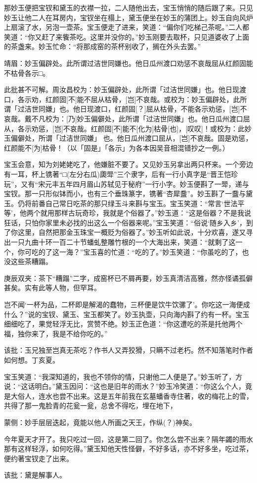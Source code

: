 \begin{parag}
    那妙玉便把宝钗和黛玉的衣襟一拉，二人随他出去，宝玉悄悄的随后跟了来。只见妙玉让他二人在耳房内，宝钗坐在榻上，黛玉便坐在妙玉的蒲团上。妙玉自向风炉上扇滚了水，另泡一壶茶。宝玉便走了进来，笑道：“偏你们吃梯己茶呢。”二人都笑道：“你又赶了来飺茶吃。这里并没你的。”妙玉刚要去取杯，只见道婆收了上面的茶盏来。妙玉忙命：“将那成窑的茶杯别收了，搁在外头去罢。”\begin{note}靖眉：妙玉偏辟处。此所谓过洁世同嫌也。他日瓜州渡口劝惩不哀哉屈从红颜固能不枯骨各示□。\end{note}\begin{subnote}此批甚不可解。周汝昌校为：妙玉偏辟处，此所谓「过洁世同嫌」也。他日现渡口，各示劝，红颜固[不]能不屈从枯骨，[岂]不哀哉。或校为：妙玉偏辟处，此所谓「过洁世同嫌」也。他日现渡口，红颜固[？]屈从枯骨，不能各示劝惩，[岂]不哀哉。戴不凡校为：[乃]妙玉偏僻处，此所谓「过洁世同嫌」也。他日瓜州渡口屈从，各示劝惩，[岂]不哀哉。红颜固[不]能不[化为]枯骨[也]，[叹叹]！或校为：此妙玉偏僻处，所谓「过洁世同嫌」 也。他日瓜州渡口屈从，[岂]不哀哉。固是劝惩，红颜能不[为]枯骨！（以「固是」「各示」为各本因吴音相混错抄之一例。）\end{subnote}宝玉会意，知为刘姥姥吃了，他嫌脏不要了。又见妙玉另拿出两只杯来。一个旁边有一耳，杯上镌著“□(左分右瓜)瓟斝”三个隶字，后有一行小真字是“晋王恺珍玩”，又有“宋元丰五年四月眉山苏轼见于秘府”一行小字。妙玉便斟了一斝，递与宝钗。那一只形似钵而小，也有三个垂珠篆字，镌著“杏犀䀉”。妙玉斟了一䀉与黛玉。仍将前番自己常日吃茶的那只绿玉斗来斟与宝玉。宝玉笑道：“常言‘世法平等’，他两个就用那样古玩奇珍，我就是个俗器了。”妙玉道：“这是俗器？不是我说狂话，只怕你家里未必找的出这么一个俗器来呢。”宝玉笑道：“俗说‘随乡入乡’，到了你这里，自然把那金玉珠宝一概贬为俗器了。”妙玉听如此说，十分欢喜，遂又寻出一只九曲十环一百二十节蟠虬整雕竹根的一个大海出来，笑道：“就剩了这一个，你可吃的了这一海？”宝玉喜的忙道：“吃的了。”妙玉笑道：“你虽吃的了，也没这些茶糟蹋。\begin{note}庚辰双夹：茶下“糟蹋”二字，成窑杯已不屑再要，妙玉真清洁高雅，然亦怪谲孤僻甚矣。实有此等人物，但罕耳。\end{note}岂不闻‘一杯为品，二杯即是解渴的蠢物，三杯便是饮牛饮骡了’。你吃这一海便成什么？”说的宝钗、黛玉、宝玉都笑了。妙玉执壶，只向海内斟了约有一杯。宝玉细细吃了，果觉轻浮无比，赏赞不绝。妙玉正色道：“你这遭吃的茶是托他两个福，独你来了，我是不给你吃的。”\begin{note}该批：玉兄独至岂真无茶吃？作书人又弄狡猾，只瞒不过老朽。然不知落笔时作者如何想。丁亥夏。\end{note}宝玉笑道：“我深知道的，我也不领你的情，只谢他二人便是了。”妙玉听了，方说：“这话明白。”黛玉因问：“这也是旧年的雨水？”妙玉冷笑道：“你这么个人，竟是大俗人，连水也尝不出来。这是五年前我在玄墓蟠香寺住著，收的梅花上的雪，共得了那一鬼脸青的花瓮一瓮，总舍不得吃，埋在地下，\begin{note}蒙侧：妙手层层迭起，竟能以他人所画之天王，作纵(？)神矣。\end{note}今年夏天才开了。我只吃过一回，这是第二回了。你怎么尝不出来？隔年蠲的雨水那有这样轻浮，如何吃得。”黛玉知他天性怪僻，不好多话，亦不好多坐，吃过茶，便约著宝钗走了出来。\begin{note}该批：黛是解事人。\end{note}
\end{parag}


